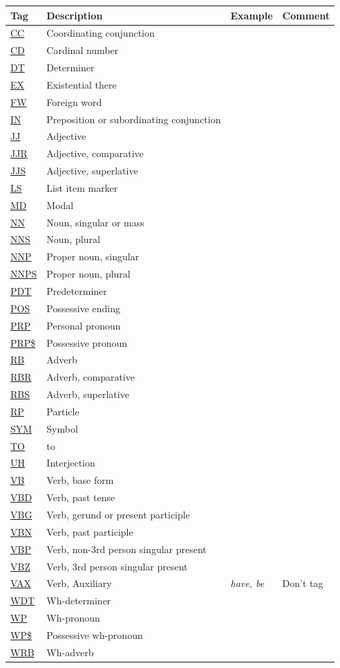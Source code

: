 \documentclass[12pt]{book} %
\newcommand{\eng}[1]{\textit{#1}}
\newcommand{\tg}[1]{\url{#1}}  %
\begin{document}
\begin{CJK}{UTF8}{gbsn}
\begin{table}
  \centering
  \begin{tabular}{lll}
    \textbf{Tag} & \textbf{Description} & \textbf{Example} & \textbf{Comment}\\
\hline
\tg{CC} & Coordinating conjunction \\
\tg{CD} & Cardinal number \\
\tg{DT} & Determiner \\
\tg{EX} & Existential there \\
\tg{FW} & Foreign word \\
\tg{IN} & Preposition or subordinating conjunction \\
\tg{JJ} & Adjective \\
\tg{JJR} & Adjective, comparative \\
\tg{JJS} & Adjective, superlative \\
\tg{LS} & List item marker \\
\tg{MD} & Modal \\
\tg{NN} & Noun, singular or mass \\
\tg{NNS} & Noun, plural \\
\tg{NNP} & Proper noun, singular \\
\tg{NNPS} & Proper noun, plural \\
\tg{PDT} & Predeterminer \\
\tg{POS} & Possessive ending \\
\tg{PRP} & Personal pronoun \\
\tg{PRP\$} & Possessive pronoun \\
\tg{RB} & Adverb \\
\tg{RBR} & Adverb, comparative \\
\tg{RBS} & Adverb, superlative \\
\tg{RP} & Particle \\
\tg{SYM} & Symbol \\
\tg{TO} & to \\
\tg{UH} & Interjection \\
\tg{VB} & Verb, base form \\
\tg{VBD} & Verb, past tense \\
\tg{VBG} & Verb, gerund or present participle \\
\tg{VBN} & Verb, past participle \\
\tg{VBP} & Verb, non-3rd person singular present \\
\tg{VBZ} & Verb, 3rd person singular present \\
\tg{VAX} & Verb, Auxiliary & \eng{have, be} & Don't tag\\
\tg{WDT} & Wh-determiner \\
\tg{WP} & Wh-pronoun \\
\tg{WP\$} & Possessive wh-pronoun \\
\tg{WRB} & Wh-adverb  \\


\end{tabular}
\end{table}
\end{CJK}
\end{document}
